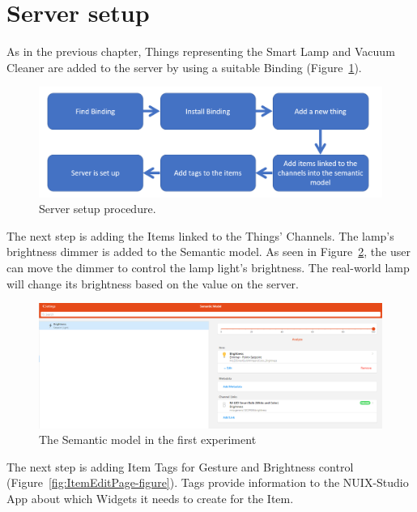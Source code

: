 \section{Server setup}
As in the previous chapter, Things representing the Smart Lamp and Vacuum Cleaner are added to the server by using a suitable Binding (Figure~\ref{fig:ServerSetupProcedure-figure}).

\begin{figure}
  \centering
  \includegraphics[width = 0.9 \linewidth]{figures/ServerSetupProcedure.png}
  \caption{Server setup procedure.}
  \label{fig:ServerSetupProcedure-figure}
\end{figure}

The next step is adding the Items linked to the Things' Channels. The lamp's brightness dimmer is added to the Semantic model. As seen in Figure~\ref{fig:SemanticModelOne-figure}, the user can move the dimmer to control the lamp light's brightness. The real-world lamp will change its brightness based on the value on the server.

\begin{figure}
  \centering
  \includegraphics[width = 0.9 \linewidth]{figures/SemanticModelOne.png}
  \caption{The Semantic model in the first experiment}
  \label{fig:SemanticModelOne-figure}
\end{figure}

The next step is adding Item Tags for Gesture and Brightness control (Figure~\ref{fig:ItemEditPage-figure}). Tags provide information to the NUIX-Studio App about which Widgets it needs to create for the Item.

